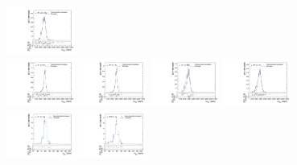 \begin{figure}[htpb]
  \includegraphics[width=0.2\textwidth]{fig/analysisAppendix/templateVsReco_VBFGbuToWW2000_r0_MVV_mu_LP_nobb_HDy_linear.pdf}\\
  \includegraphics[width=0.2\textwidth]{fig/analysisAppendix/templateVsReco_VBFGbuToWW2000_r0_MVV_mu_HP_vbf_LDy_linear.pdf}
  \includegraphics[width=0.2\textwidth]{fig/analysisAppendix/templateVsReco_VBFGbuToWW2000_r0_MVV_mu_LP_vbf_LDy_linear.pdf}
  \includegraphics[width=0.2\textwidth]{fig/analysisAppendix/templateVsReco_VBFGbuToWW2000_r0_MVV_mu_HP_vbf_HDy_linear.pdf}
  \includegraphics[width=0.2\textwidth]{fig/analysisAppendix/templateVsReco_VBFGbuToWW2000_r0_MVV_mu_LP_vbf_HDy_linear.pdf}\\
  \includegraphics[width=0.2\textwidth]{fig/analysisAppendix/templateVsReco_VBFGbuToWW2000_r0_MJ_mu_HP_bb_LDy.pdf}
  \includegraphics[width=0.2\textwidth]{fig/analysisAppendix/templateVsReco_VBFGbuToWW2000_r0_MJ_mu_LP_bb_LDy.pdf}

\end{figure}
